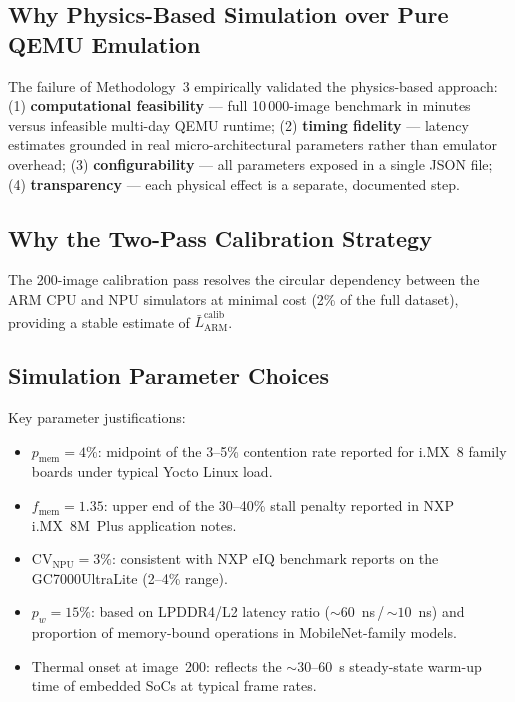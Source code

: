 \subsection{Why Physics-Based Simulation over Pure QEMU Emulation}

The failure of Methodology~3 empirically validated the physics-based approach:
(1) \textbf{computational feasibility} — full 10\,000-image benchmark in
minutes versus infeasible multi-day QEMU runtime; (2) \textbf{timing fidelity}
— latency estimates grounded in real micro-architectural parameters rather than
emulator overhead; (3) \textbf{configurability} — all parameters exposed in a
single JSON file; (4) \textbf{transparency} — each physical effect is a
separate, documented step.

\subsection{Why the Two-Pass Calibration Strategy}

The 200-image calibration pass resolves the circular dependency between the
ARM CPU and NPU simulators at minimal cost (2\% of the full dataset), providing
a stable estimate of $\bar{L}_{\text{ARM}}^{\text{calib}}$.

\subsection{Simulation Parameter Choices}

Key parameter justifications:
\begin{itemize}[itemsep=1pt, topsep=3pt]
    \item $p_{\text{mem}}=4\%$: midpoint of the 3--5\% contention rate
          reported for i.MX~8 family boards under typical Yocto Linux load.
    \item $f_{\text{mem}}=1.35$: upper end of the 30--40\% stall penalty
          reported in NXP i.MX~8M~Plus application notes.
    \item $\text{CV}_{\text{NPU}}=3\%$: consistent with NXP eIQ benchmark
          reports on the GC7000UltraLite (2--4\% range).
    \item $p_w=15\%$: based on LPDDR4/L2 latency ratio
          ($\sim60$~ns\,/\,$\sim10$~ns) and proportion of memory-bound
          operations in MobileNet-family models.
    \item Thermal onset at image~200: reflects the $\sim30$--60~s
          steady-state warm-up time of embedded SoCs at typical frame rates.
\end{itemize}

